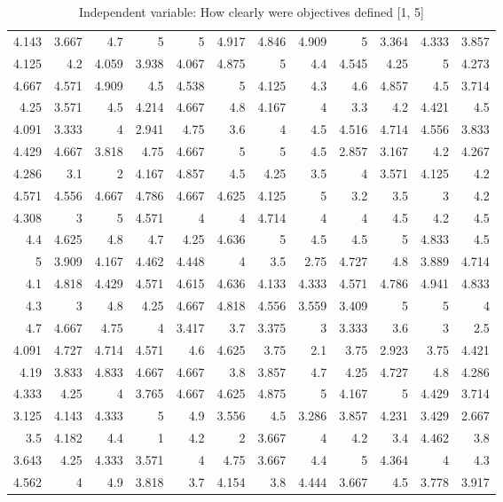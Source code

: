 \documentclass[10pt]{report}
\begin{document}
\begin{table}
\begin{tabular}{rrrrrrrrrrrr}
	4.143 & 3.667 & 4.7   & 5     & 5     & 4.917 & 4.846 & 4.909 & 5     & 3.364 & 4.333 & 3.857 \\
	4.125 & 4.2   & 4.059 & 3.938 & 4.067 & 4.875 & 5     & 4.4   & 4.545 & 4.25  & 5     & 4.273 \\
	4.667 & 4.571 & 4.909 & 4.5   & 4.538 & 5     & 4.125 & 4.3   & 4.6   & 4.857 & 4.5   & 3.714 \\
	4.25  & 3.571 & 4.5   & 4.214 & 4.667 & 4.8   & 4.167 & 4     & 3.3   & 4.2   & 4.421 & 4.5   \\
	4.091 & 3.333 & 4     & 2.941 & 4.75  & 3.6   & 4     & 4.5   & 4.516 & 4.714 & 4.556 & 3.833 \\
	4.429 & 4.667 & 3.818 & 4.75  & 4.667 & 5     & 5     & 4.5   & 2.857 & 3.167 & 4.2   & 4.267 \\
	4.286 & 3.1   & 2     & 4.167 & 4.857 & 4.5   & 4.25  & 3.5   & 4     & 3.571 & 4.125 & 4.2   \\
	4.571 & 4.556 & 4.667 & 4.786 & 4.667 & 4.625 & 4.125 & 5     & 3.2   & 3.5   & 3     & 4.2   \\
	4.308 & 3     & 5     & 4.571 & 4     & 4     & 4.714 & 4     & 4     & 4.5   & 4.2   & 4.5   \\
	4.4   & 4.625 & 4.8   & 4.7   & 4.25  & 4.636 & 5     & 4.5   & 4.5   & 5     & 4.833 & 4.5   \\
	5     & 3.909 & 4.167 & 4.462 & 4.448 & 4     & 3.5   & 2.75  & 4.727 & 4.8   & 3.889 & 4.714 \\
	4.1   & 4.818 & 4.429 & 4.571 & 4.615 & 4.636 & 4.133 & 4.333 & 4.571 & 4.786 & 4.941 & 4.833 \\
	4.3   & 3     & 4.8   & 4.25  & 4.667 & 4.818 & 4.556 & 3.559 & 3.409 & 5     & 5     & 4     \\
	4.7   & 4.667 & 4.75  & 4     & 3.417 & 3.7   & 3.375 & 3     & 3.333 & 3.6   & 3     & 2.5   \\
	4.091 & 4.727 & 4.714 & 4.571 & 4.6   & 4.625 & 3.75  & 2.1   & 3.75  & 2.923 & 3.75  & 4.421 \\
	4.19  & 3.833 & 4.833 & 4.667 & 4.667 & 3.8   & 3.857 & 4.7   & 4.25  & 4.727 & 4.8   & 4.286 \\
	4.333 & 4.25  & 4     & 3.765 & 4.667 & 4.625 & 4.875 & 5     & 4.167 & 5     & 4.429 & 3.714 \\
	3.125 & 4.143 & 4.333 & 5     & 4.9   & 3.556 & 4.5   & 3.286 & 3.857 & 4.231 & 3.429 & 2.667 \\
	3.5   & 4.182 & 4.4   & 1     & 4.2   & 2     & 3.667 & 4     & 4.2   & 3.4   & 4.462 & 3.8   \\
	3.643 & 4.25  & 4.333 & 3.571 & 4     & 4.75  & 3.667 & 4.4   & 5     & 4.364 & 4     & 4.3   \\
	4.562 & 4     & 4.9   & 3.818 & 3.7   & 4.154 & 3.8   & 4.444 & 3.667 & 4.5   & 3.778 & 3.917 \\
	\hline
	\end{tabular}

    \caption{Independent variable: How clearly were objectives defined [1, 5]}
\end{table}
\end{document}
